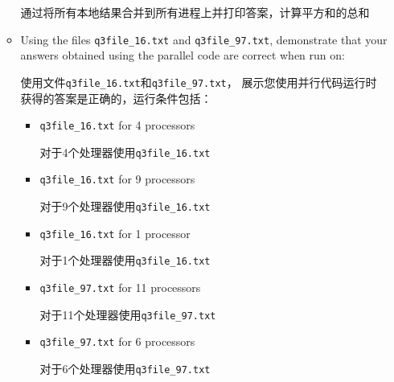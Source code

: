 \documentclass{article}
\begin{document}
\begin{enumerate}
\begin{itemize}
        通过将所有本地结果合并到所有进程上并打印答案，计算平方和的总和
        \item Using the files \texttt{q3file\_16.txt} and \texttt{q3file\_97.txt}, 
        demonstrate that your answers obtained using the parallel code are correct 
        when run on:

        使用文件\texttt{q3file\_16.txt}和\texttt{q3file\_97.txt}，
        展示您使用并行代码运行时获得的答案是正确的，运行条件包括：
        \begin{itemize}
            \item \texttt{q3file\_16.txt} for 4 processors

            对于4个处理器使用\texttt{q3file\_16.txt}
            \item \texttt{q3file\_16.txt} for 9 processors
            
            对于9个处理器使用\texttt{q3file\_16.txt}
            \item \texttt{q3file\_16.txt} for 1 processor
            
            对于1个处理器使用\texttt{q3file\_16.txt}
            \item \texttt{q3file\_97.txt} for 11 processors
            
            对于11个处理器使用\texttt{q3file\_97.txt}
            \item \texttt{q3file\_97.txt} for 6 processors
            
            对于6个处理器使用\texttt{q3file\_97.txt}
        \end{itemize}
    \end{itemize}


\end{enumerate}
\end{document}
